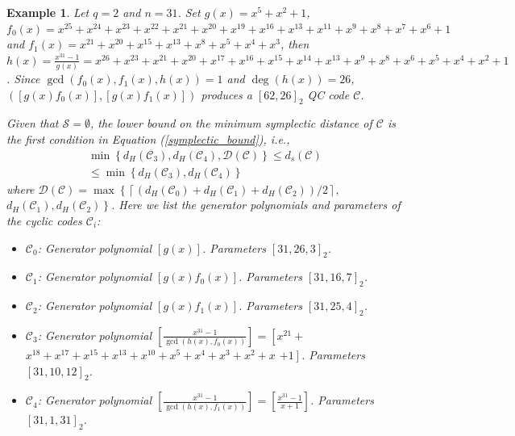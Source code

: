 \documentclass[journal]{IEEEtran}
\newtheorem{example}{Example}
\begin{document}
\begin{example}\label{good_Ex_for additive}
	Let $q=2$ and $n=31$. Set $g(x)=x^5 + x^2 + 1$, $f_0(x)=x^{25} + x^{24} + x^{23} + x^{22} + x^{21} + x^{20} + x^{19} + x^{16} + x^{13} + x^{11} + x^9 +x^8 + x^7 + x^6 + 1$ and $f_1(x)=x^{21} + x^{20} + x^{15} + x^{13} + x^8 + x^5 + x^4 + x^3$, then $h(x)=\frac{x^{31}-1}{g(x)}=x^{26} + x^{23} + x^{21} + x^{20} + x^{17} + x^{16} + x^{15} + x^{14} + x^{13} + x^9 + x^8 + x^6 +
	x^5 + x^4 + x^2 + 1$. Since $\gcd(f_0(x),f_1(x),h(x))=1$ and $\deg(h(x))=26$, $([g(x)f_0(x)],[g(x)f_1(x)])$ produces a $\left[62,26\right]_2$ QC code $\mathscr{C}$.
 

 Given that $\mathcal{S}=\emptyset$, the lower bound on the minimum symplectic distance of $\mathscr{C}$ is the first condition in Equation (\ref{symplectic_bound}), i.e., 
  \begin{equation}
 	\begin{array}{rl}
 		\min\left\{ d_H(\mathscr{C}_3),d_H(\mathscr{C}_4), \mathcal{D}(\mathscr{C})\right\} \le d_s(\mathscr{C}) &\\
 		\le \min\left\{d_H(\mathscr{C}_3),d_H(\mathscr{C}_4)\right\}&
 	\end{array}
 \end{equation}
 where $\mathcal{D}(\mathscr{C})=\max \left\{ \left\lceil \left(d_H(\mathscr{C}_0)+d_H(\mathscr{C}_1)+d_H(\mathscr{C}_2)\right)/2\right\rceil \right.,$ $\left.d_H(\mathscr{C}_1),d_H(\mathscr{C}_2)\right\}$.
Here we list the generator polynomials and parameters of the cyclic codes $\mathscr{C}_i$:
 \begin{itemize}
      \item  $\mathscr{C}_0$: Generator polynomial $\left[g(x)\right]$. Parameters $\left[31,26,3\right]_2$.
      \item  $\mathscr{C}_1$: Generator polynomial $\left[g(x)f_0(x)\right]$. Parameters $\left[31,16,7\right]_2$.
      \item  $\mathscr{C}_2$: Generator polynomial $\left[g(x)f_1(x)\right]$. Parameters $\left[31,25,4\right]_2$.
     \item $\mathscr{C}_3$: Generator polynomial $\left[\frac{x^{31}-1}{\gcd(h(x),f_0(x))}\right]=\left[x^{21} +\right. $ $ \left. x^{18} + x^{17} + x^{15} +x^{13} + x^{10} + x^5 + x^4 + x^3 + x^2 + x \right. $ $ \left.+ 1\right]$. Parameters $\left[31,10,12\right]_2$.
      \item $\mathscr{C}_4$: Generator polynomial $\left[\frac{x^{31}-1}{\gcd(h(x),f_1(x))}\right]=\left[\frac{x^{31}-1}{x+1}\right]$. Parameters $\left[31,1,31\right]_2$.
 \end{itemize}


\end{example}
\end{document}
